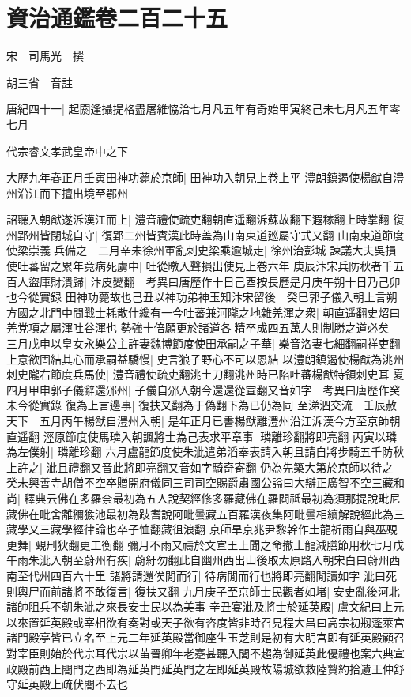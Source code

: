 \chapter{資治通鑑卷二百二十五}
宋　司馬光　撰

胡三省　音註

唐紀四十一|{
	起閼逢攝提格盡屠維恊洽七月凡五年有奇始甲寅終己未七月凡五年零七月}


代宗睿文孝武皇帝中之下

大歷九年春正月壬寅田神功薨於京師|{
	田神功入朝見上卷上平}
澧朗鎮遏使楊猷自澧州沿江而下擅出境至鄂州

詔聽入朝猷遂泝漢江而上|{
	澧音禮使疏吏翻朝直遥翻泝蘇故翻下遐稼翻上時掌翻}
復州郢州皆閉城自守|{
	復郢二州皆賓漢此時盖為山南東道廵屬守式又翻}
山南東道節度使梁崇義兵備之　二月辛未徐州軍亂刺史梁乘逾城走|{
	徐州治彭城}
諫議大夫吳損使吐蕃留之累年竟病死虜中|{
	吐從暾入聲損出使見上卷六年}
庚辰汴宋兵防秋者千五百人盜庫財潰歸|{
	汴皮變翻　考異曰唐歷作十日己酉按長歷是月庚午朔十日乃己卯也今從實録}
田神功薨故也己丑以神功弟神玉知汴宋留後　癸巳郭子儀入朝上言朔方國之北門中間戰士耗散什纔有一今吐蕃兼河隴之地雜羌渾之衆|{
	朝直遥翻史炤曰羌党項之屬渾吐谷渾也}
勢強十倍願更於諸道各精卒成四五萬人則制勝之道必矣　三月戊申以皇女永樂公主許妻魏博節度使田承嗣之子華|{
	樂音洛妻七細翻嗣祥吏翻}
上意欲固結其心而承嗣益驕慢|{
	史言狼子野心不可以恩結}
以澧朗鎮遏使楊猷為洮州刺史隴右節度兵馬使|{
	澧音禮使疏吏翻洮土刀翻洮州時已陷吐蕃楊猷特領刺史耳}
夏四月甲申郭子儀辭還邠州|{
	子儀自邠入朝今還還從宣翻又音如字　考異曰唐歷作癸未今從實錄}
復為上言邊事|{
	復扶又翻為于偽翻下為已仍為同}
至涕泗交流　壬辰赦天下　五月丙午楊猷自澧州入朝|{
	是年正月已書楊猷離澧州沿江泝漢今方至京師朝直遥翻}
涇原節度使馬璘入朝諷將士為己表求平章事|{
	璘離珍翻將即亮翻}
丙寅以璘為左僕射|{
	璘離珍翻}
六月盧龍節度使朱泚遣弟滔奉表請入朝且請自將步騎五千防秋上許之|{
	泚且禮翻又音此將即亮翻又音如字騎奇寄翻}
仍為先築大第於京師以待之　癸未興善寺胡僧不空卒贈開府儀同三司司空賜爵肅國公謚曰大辯正廣智不空三藏和尚|{
	釋典云佛在多羅柰最初為五人說契經修多羅藏佛在羅閲祗最初為須那提說毗尼藏佛在毗舍離獼㺅池最初為跂耆說阿毗曇藏五百羅漢夜集阿毗曇相續解說經此為三藏學又三藏學經律論也卒子恤翻藏徂浪翻}
京師旱京兆尹黎幹作土龍祈雨自與巫覡更舞|{
	覡刑狄翻更工衡翻}
彌月不雨又禱於文宣王上聞之命撤土龍減膳節用秋七月戊午雨朱泚入朝至蔚州有疾|{
	蔚紆勿翻此自幽州西出山後取太原路入朝宋白曰蔚州西南至代州四百六十里}
諸將請還俟閒而行|{
	待病閒而行也將即亮翻閒讀如字}
泚曰死則輿尸而前諸將不敢復言|{
	復扶又翻}
九月庚子至京師士民觀者如堵|{
	安史亂後河北諸帥阻兵不朝朱泚之來長安士民以為美事}
辛丑宴泚及將士於延英殿|{
	盧文紀曰上元以來置延英殿或宰相欲有奏對或天子欲有咨度皆非時召見程大昌曰高宗初剏蓬萊宫諸門殿亭皆已立名至上元二年延英殿當御座生玉芝則是初有大明宫即有延英殿顧召對宰臣則始於代宗耳代宗以苖晉卿年老蹇甚聽入閭不趨為御延英此優禮也案六典宣政殿前西上閤門之西即為延英門延英門之左即延英殿故陽城欲救陸䞇約拾遺王仲舒守延英殿上疏伏閤不去也}
